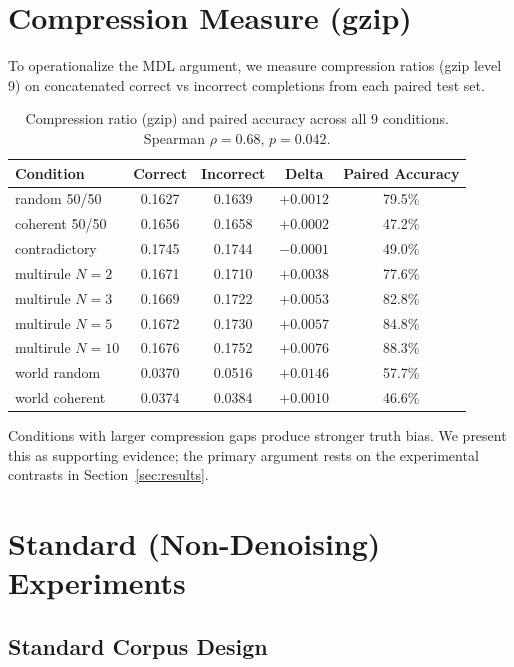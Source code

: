 \documentclass{article}
\begin{document}
\section{Compression Measure (gzip)}
\label{app:compression}

To operationalize the MDL argument, we measure compression ratios (gzip level 9) on concatenated correct vs incorrect completions from each paired test set.

\begin{table}[h]
\centering
\small
\begin{tabular}{lcccc}
\toprule
Condition & Correct & Incorrect & Delta & Paired Accuracy \\
\midrule
random 50/50     & 0.1627 & 0.1639 & $+0.0012$ & 79.5\% \\
coherent 50/50   & 0.1656 & 0.1658 & $+0.0002$ & 47.2\% \\
contradictory    & 0.1745 & 0.1744 & $-0.0001$ & 49.0\% \\
multirule $N{=}2$  & 0.1671 & 0.1710 & $+0.0038$ & 77.6\% \\
multirule $N{=}3$  & 0.1669 & 0.1722 & $+0.0053$ & 82.8\% \\
multirule $N{=}5$  & 0.1672 & 0.1730 & $+0.0057$ & 84.8\% \\
multirule $N{=}10$ & 0.1676 & 0.1752 & $+0.0076$ & 88.3\% \\
world random     & 0.0370 & 0.0516 & $+0.0146$ & 57.7\% \\
world coherent   & 0.0374 & 0.0384 & $+0.0010$ & 46.6\% \\
\bottomrule
\end{tabular}
\caption{Compression ratio (gzip) and paired accuracy across all 9 conditions. Spearman $\rho = 0.68$, $p = 0.042$.}
\label{tab:compression}
\end{table}

Conditions with larger compression gaps produce stronger truth bias. We present this as supporting evidence; the primary argument rests on the experimental contrasts in Section~\ref{sec:results}.

\section{Standard (Non-Denoising) Experiments}
\label{app:standard}

\subsection{Standard Corpus Design}
\end{document}
